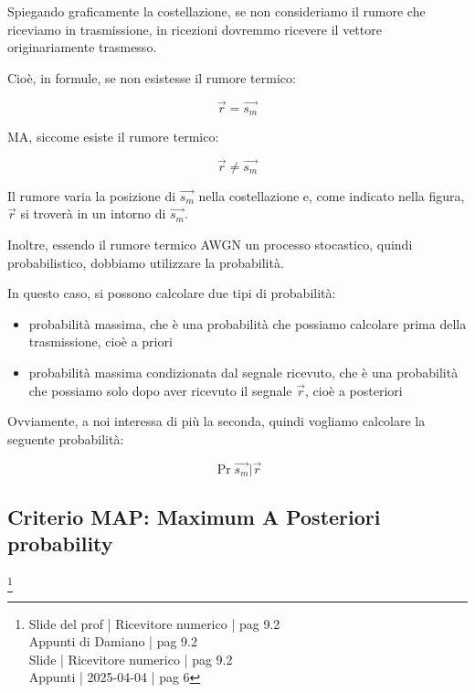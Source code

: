 Spiegando graficamente la costellazione, 
se non consideriamo il rumore che riceviamo in trasmissione, 
in ricezioni dovremmo ricevere il vettore originariamente trasmesso. \newline 

Cioè, in formule, se non esistesse il rumore termico: 

{
    \Large 
    \begin{equation}
        \overrightarrow{r} = \overrightarrow{s_m}
    \end{equation}
}

MA, siccome esiste il rumore termico: 

{
    \Large 
    \begin{equation}
        \overrightarrow{r} \neq \overrightarrow{s_m}
    \end{equation}
}

Il rumore varia la posizione di $\overrightarrow{s_m}$ nella costellazione e, 
come indicato nella figura, $\overrightarrow{r}$ si troverà in un intorno di $\overrightarrow{s_m}$. \newline 

Inoltre, essendo il rumore termico AWGN un processo stocastico, quindi probabilistico, 
dobbiamo utilizzare la probabilità. \newline 

In questo caso, si possono calcolare due tipi di probabilità: 

\begin{itemize}
    \item probabilità massima, che è una probabilità che possiamo calcolare prima della trasmissione, cioè a priori 
    \item probabilità massima condizionata dal segnale ricevuto, che è una probabilità che possiamo solo dopo aver ricevuto il segnale $\overrightarrow{r}$, cioè a posteriori
\end{itemize}

Ovviamente, a noi interessa di più la seconda, quindi vogliamo calcolare la seguente probabilità: 

{
    \Large 
    \begin{equation}
        \Pr{\overrightarrow{s_m} | \overrightarrow{r}}
    \end{equation}
}
\newpage 

\subsection{Criterio MAP: Maximum A Posteriori probability}
\footnote{Slide del prof | Ricevitore numerico | pag 9.2 \\  
Appunti di Damiano | pag 9.2 \\ 
Slide | Ricevitore numerico | pag 9.2 \\
Appunti | 2025-04-04 | pag 6
}

